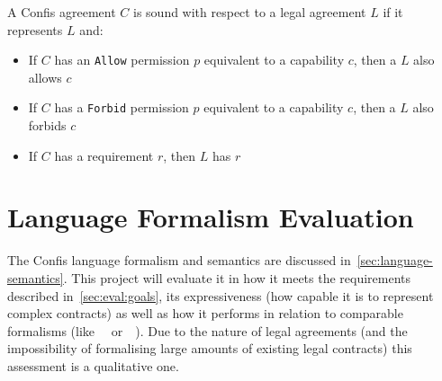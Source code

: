\begin{definition}[Soundness]
    \label{def:soundness}
    A Confis agreement $C$ is sound with respect to a legal agreement $L$ if it represents $L$ and:

    \begin{itemize}
        \item If $C$ has an \texttt{Allow} permission $p$ equivalent to a capability $c$, then a $L$ also allows $c$
        \item If $C$ has a \texttt{Forbid} permission $p$ equivalent to a capability $c$, then a $L$ also forbids $c$
        \item If $C$ has a requirement $r$, then $L$ has $r$
    \end{itemize}
\end{definition}


\section{Language Formalism Evaluation}\label{sec:language-formalism-evaluation}









%

The Confis language formalism and semantics are discussed in~\autoref{sec:language-semantics}.
This project will evaluate it in how it meets the requirements described in~\autoref{sec:eval:goals}, its expressiveness (how capable it is to represent complex contracts) as well as how it performs in relation to comparable formalisms (like~~\cite{symboleo2020} or~~\cite{accordHomepage}).
Due to the nature of legal agreements (and the impossibility of formalising large amounts of existing legal contracts) this assessment is a qualitative one.

